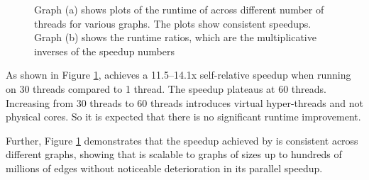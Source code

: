 \begin{figure}%
    \centering
    \qquad
    \caption{Graph (a) shows plots of the runtime of  across different number of threads for various graphs. The plots show consistent speedups. Graph (b) shows the runtime ratios, which are the multiplicative inverses of the speedup numbers}%
    \label{fig:speedup}%
\end{figure}


As shown in Figure \ref{fig:speedup},  achieves a 11.5–14.1x self-relative speedup when running on 30 threads compared to 1 thread. The speedup plateaus at 60 threads. Increasing from 30 threads to 60 threads introduces virtual hyper-threads and not physical cores. So it is expected that there is no significant runtime improvement.

Further, Figure \ref{fig:speedup} demonstrates that the speedup achieved by  is consistent across different graphs, showing that  is scalable to graphs of sizes up to hundreds of millions of edges without noticeable deterioration in its parallel speedup. 



